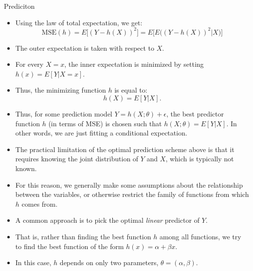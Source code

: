 \begin{frame}[allowframebreaks]{Prediciton}
\begin{itemize}
    \framebreak 
    
    \item Using the law of total expectation, we get:
    $$
    \text{MSE}(h) = E\big[(Y - h(X))^2\big] = E\Big[E\big((Y - h(X))^2 | X\big)\Big]
    $$
    \item The outer expectation is taken with respect to $X$. 
    \item For every $X = x$, the inner expectation is minimized by setting $h(x) = E[Y | X = x]$.
    \item Thus, the minimizing function $h$ is equal to:
    $$
    h(X) = E[Y|X].
    $$
    \item Thus, for some prediction model $Y = h(X; \theta) + \epsilon$, the best predictor function $h$ (in terms of MSE) is chosen such that $h(X; \theta) = E[Y|X]$. In other words, we are just fitting a conditional expectation. 
  
  \framebreak
  
    \item The practical limitation of the optimal prediction scheme above is that it requires knowing the joint distribution of $Y$ and $X$, which is typically not known.
    \item For this reason, we generally make some assumptions about the relationship between the variables, or otherwise restrict the family of functions from which $h$ comes from.
    \item A common approach is to pick the optimal \emph{linear} predictor of $Y$.
    \item That is, rather than finding the best function $h$ among all functions, we try to find the best function of the form $h(x) = \alpha +\beta x$.
    \item In this case, $h$ depends on only two parameters, $\theta = (\alpha, \beta)$.
    
    \framebreak
    

\end{itemize}
\end{frame}
